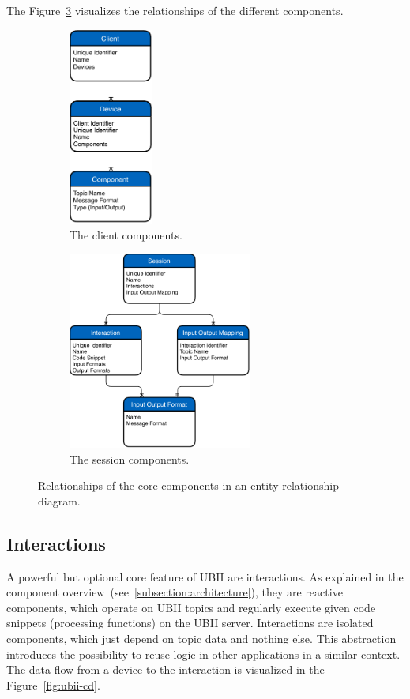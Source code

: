 The Figure~\ref{fig:ubii-er} visualizes the relationships of the different components.

\begin{figure}[htpb]
  \centering
  \begin{subfigure}{.5\textwidth}
    \centering
    \includegraphics[height=6.5cm]{figures/ubii_er_client.pdf}
    \caption{The client components.}\label{fig:ubii-er-client}
  \end{subfigure}%
  \begin{subfigure}{.5\textwidth}
    \centering
    \includegraphics[height=6.5cm]{figures/ubii_er_server.pdf}
    \caption{The session components.}\label{fig:ubii-er-server}
  \end{subfigure}
  \caption[UBII components diagram]{Relationships of the core components in an entity relationship diagram.}\label{fig:ubii-er}
\end{figure}


\subsection{Interactions}\label{subsection:interactions}
A powerful but optional core feature of \ac{UBII} are interactions. As explained in the component overview~(see~\ref{subsection:architecture}), they are reactive components, which operate on \ac{UBII} topics and regularly execute given code snippets (processing functions) on the \ac{UBII} server. Interactions are isolated components, which just depend on topic data and nothing else. This abstraction introduces the possibility to reuse logic in other applications in a similar context. The data flow from a device to the interaction is visualized in the Figure~\ref{fig:ubii-cd}.

